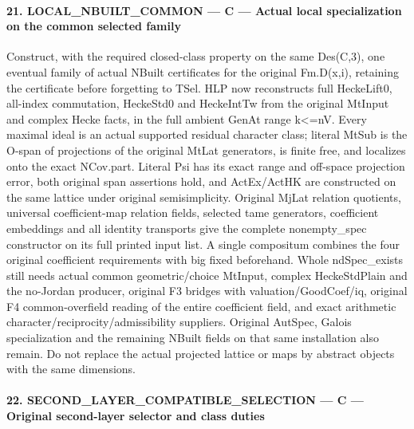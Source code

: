 \documentclass[11pt,a4paper]{article}
\numberwithin{equation}{section}
\theoremstyle{remark}\newtheorem{remark}[theorem]{Remark}
\begin{document}
\paragraph{21. LOCAL\_\allowbreak NBUILT\_\allowbreak COMMON — C — Actual local specialization on the common selected family}

Construct, with the required closed-class property on the same Des(C,3), one eventual family of actual NBuilt certificates for the original Fm.D(x,i), retaining the certificate before forgetting to TSel. HLP now reconstructs full HeckeLift0, all-index commutation, HeckeStd0 and HeckeIntTw from the original MtInput and complex Hecke facts, in the full ambient GenAt range k<=nV. Every maximal ideal is an actual supported residual character class; literal MtSub is the O-span of projections of the original MtLat generators, is finite free, and localizes onto the exact NCov.part. Literal Psi has its exact range and off-space projection error, both original span assertions hold, and ActEx/ActHK are constructed on the same lattice under original semisimplicity. Original MjLat relation quotients, universal coefficient-map relation fields, selected tame generators, coefficient embeddings and all identity transports give the complete nonempty\_\allowbreak spec constructor on its full printed input list. A single compositum combines the four original coefficient requirements with big fixed beforehand. Whole ndSpec\_\allowbreak exists still needs actual common geometric/choice MtInput, complex HeckeStdPlain and the no-Jordan producer, original F3 bridges with valuation/GoodCoef/iq, original F4 common-overfield reading of the entire coefficient field, and exact arithmetic character/reciprocity/admissibility suppliers. Original AutSpec, Galois specialization and the remaining NBuilt fields on that same installation also remain. Do not replace the actual projected lattice or maps by abstract objects with the same dimensions.



\paragraph{22. SECOND\_\allowbreak LAYER\_\allowbreak COMPATIBLE\_\allowbreak SELECTION — C — Original second-layer selector and class duties}
\end{document}
